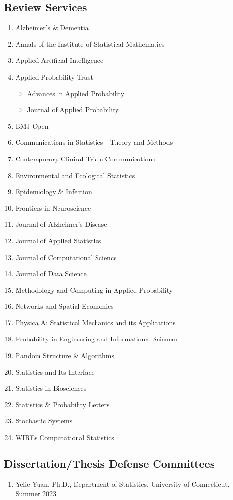 \documentclass[12pt]{article}
\begin{document}
	\subsection*{Review Services}
	\begin{enumerate}
		\item Alzheimer's \& Dementia
		\item Annals of the Institute of Statistical Mathematics
		\item Applied Artificial Intelligence
		\item Applied Probability Trust
		\begin{itemize}
			\item Advances in Applied Probability 
			\item Journal of Applied Probability
		\end{itemize}
		\item BMJ Open
		\item Communications in Statistics---Theory and Methods
		\item Contemporary Clinical Trials Communications
		\item Environmental and Ecological Statistics
		\item Epidemiology \& Infection
		\item Frontiers in Neuroscience
		\item Journal of Alzheimer's Disease
		\item Journal of Applied Statistics
		\item Journal of Computational Science 
		\item Journal of Data Science
		\item Methodology and Computing in Applied Probability
		\item Networks and Spatial Economics
		\item Physica A: Statistical Mechanics and its Applications
		\item Probability in Engineering and Informational Sciences
		\item Random Structure \& Algorithms
		\item Statistics and Its Interface
		\item Statistics in Biosciences
		\item Statistics \& Probability Letters
		\item Stochastic Systems
		\item WIREs Computational Statistics
	\end{enumerate}
	
	\subsection*{Dissertation/Thesis Defense Committees}
	\begin{enumerate}
		\item Yelie Yuan, Ph.D., Department of Statistics, 
		University of Connecticut, Summer 2023
	\end{enumerate}
	
\end{document}
